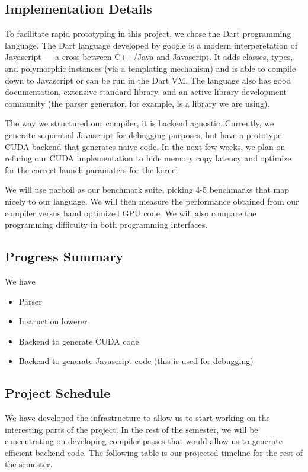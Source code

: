 \subsection{Implementation Details}

To facilitate rapid prototyping in this project, we chose the Dart
programming language. The Dart language developed by google is a modern
interperetation of Javascript --- a cross between C++/Java and
Javascript. It adds classes, types, and polymorphic instances (via a
templating mechanism) and is able to compile down to Javascript or can
be run in the Dart VM. The language also has good documentation,
extensive standard library, and an active library development community
(the parser generator, for example, is a library we are using).

The way we structured our compiler, it is backend agnostic. Currently,
we generate sequential Javascript for debugging purposes, but have a
prototype CUDA backend that generates naive code. In the next few weeks,
we plan on refining our CUDA implementation to hide memory copy latency
and optimize for the correct launch paramaters for the kernel.

We will use parboil as our benchmark suite, picking 4-5 benchmarks that
map nicely to our language. We will then measure the performance
obtained from our compiler versus hand optimized GPU code. We will also
compare the programming difficulty in both programming interfaces.

\subsection{Progress Summary}

We have

\begin{itemize}
\itemsep1pt\parskip0pt
\item
  Parser
\item
  Instruction lowerer
\item
  Backend to generate CUDA code
\item
  Backend to generate Javascript code (this is used for debugging)
\end{itemize}

\subsection{Project Schedule}

We have developed the infrastructure to allow us to start working on the
interesting parts of the project. In the rest of the semester, we will
be concentrating on developing compiler passes that would allow us to
generate efficient backend code. The following table is our projected
timeline for the rest of the semester.

